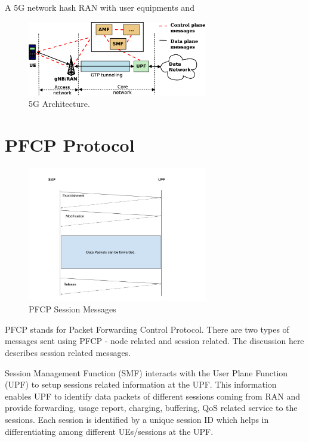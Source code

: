 A 5G network hash RAN with user equipments and 
\begin{figure}[htbp]
	\centering
       \includegraphics[width=0.7\textwidth]{fig/5g_arch.eps}
       \setlength{\belowcaptionskip}{-12pt}
	\caption{5G Architecture.}
	\label{fig:5g_arch}
       \end{figure}
       




\section {PFCP Protocol\label{sec:PFCP}}
 \begin{figure}[htbp]
    \centering
    \includegraphics[width=0.7\textwidth, keepaspectratio]{./fig/Introduction/PFCP.png}
    \caption{PFCP Session Messages}
    \label{fig:PFCP}
\end{figure}

PFCP stands for Packet Forwarding Control Protocol. 
 There are two types of messages sent using PFCP - node related and session related.
 The discussion here describes session related messages.

 Session Management Function (SMF) interacts with the User Plane Function (UPF) to setup sessions related 
 information at the UPF.
This  information enables UPF to identify data packets of different sessions coming from RAN 
and provide forwarding, usage report, charging, buffering, QoS related service to the sessions.
Each session is identified by a unique session ID which helps in differentiating 
among different UEs/sessions at the UPF. 

